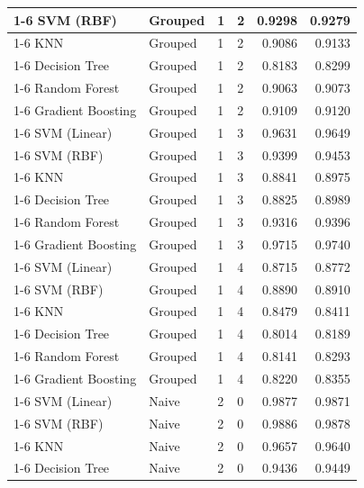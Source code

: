 \begin{table}
\begin{tabular}{llllrr}
\cline{1-6} \cline{2-6} \cline{3-6}
SVM (RBF) & Grouped & 1 & 2 & 0.9298 & 0.9279 \\
\cline{1-6} \cline{2-6} \cline{3-6}
KNN & Grouped & 1 & 2 & 0.9086 & 0.9133 \\
\cline{1-6} \cline{2-6} \cline{3-6}
Decision Tree & Grouped & 1 & 2 & 0.8183 & 0.8299 \\
\cline{1-6} \cline{2-6} \cline{3-6}
Random Forest & Grouped & 1 & 2 & 0.9063 & 0.9073 \\
\cline{1-6} \cline{2-6} \cline{3-6}
Gradient Boosting & Grouped & 1 & 2 & 0.9109 & 0.9120 \\
\cline{1-6} \cline{2-6} \cline{3-6}
SVM (Linear) & Grouped & 1 & 3 & 0.9631 & 0.9649 \\
\cline{1-6} \cline{2-6} \cline{3-6}
SVM (RBF) & Grouped & 1 & 3 & 0.9399 & 0.9453 \\
\cline{1-6} \cline{2-6} \cline{3-6}
KNN & Grouped & 1 & 3 & 0.8841 & 0.8975 \\
\cline{1-6} \cline{2-6} \cline{3-6}
Decision Tree & Grouped & 1 & 3 & 0.8825 & 0.8989 \\
\cline{1-6} \cline{2-6} \cline{3-6}
Random Forest & Grouped & 1 & 3 & 0.9316 & 0.9396 \\
\cline{1-6} \cline{2-6} \cline{3-6}
Gradient Boosting & Grouped & 1 & 3 & 0.9715 & 0.9740 \\
\cline{1-6} \cline{2-6} \cline{3-6}
SVM (Linear) & Grouped & 1 & 4 & 0.8715 & 0.8772 \\
\cline{1-6} \cline{2-6} \cline{3-6}
SVM (RBF) & Grouped & 1 & 4 & 0.8890 & 0.8910 \\
\cline{1-6} \cline{2-6} \cline{3-6}
KNN & Grouped & 1 & 4 & 0.8479 & 0.8411 \\
\cline{1-6} \cline{2-6} \cline{3-6}
Decision Tree & Grouped & 1 & 4 & 0.8014 & 0.8189 \\
\cline{1-6} \cline{2-6} \cline{3-6}
Random Forest & Grouped & 1 & 4 & 0.8141 & 0.8293 \\
\cline{1-6} \cline{2-6} \cline{3-6}
Gradient Boosting & Grouped & 1 & 4 & 0.8220 & 0.8355 \\
\cline{1-6} \cline{2-6} \cline{3-6}
SVM (Linear) & Naive & 2 & 0 & 0.9877 & 0.9871 \\
\cline{1-6} \cline{2-6} \cline{3-6}
SVM (RBF) & Naive & 2 & 0 & 0.9886 & 0.9878 \\
\cline{1-6} \cline{2-6} \cline{3-6}
KNN & Naive & 2 & 0 & 0.9657 & 0.9640 \\
\cline{1-6} \cline{2-6} \cline{3-6}
Decision Tree & Naive & 2 & 0 & 0.9436 & 0.9449 \\

\end{tabular}
\end{table}

